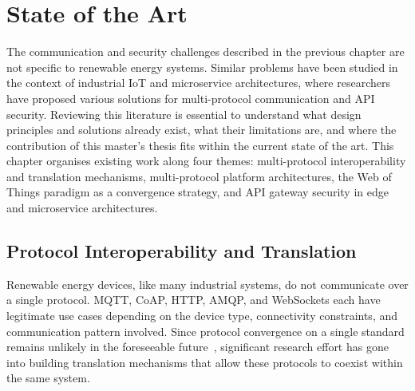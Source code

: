 \chapter{State of the Art}
\label{chap:state_of_the_art}

The communication and security challenges described in the previous chapter are not specific to renewable energy systems. Similar problems have been studied in the context of industrial IoT and microservice architectures, where researchers have proposed various solutions for multi-protocol communication and API security. Reviewing this literature is essential to understand what design principles and solutions already exist, what their limitations are, and where the contribution of this master's thesis fits within the current state of the art. This chapter organises existing work along four themes: multi-protocol interoperability and translation mechanisms, multi-protocol platform architectures, the Web of Things paradigm as a convergence strategy, and API gateway security in edge and microservice architectures.

\section{Protocol Interoperability and Translation}
\label{sec:soa_protocol_translation}

Renewable energy devices, like many industrial systems, do not communicate over a single protocol. MQTT, CoAP, HTTP, AMQP, and WebSockets each have legitimate use cases depending on the device type, connectivity constraints, and communication pattern involved. Since protocol convergence on a single standard remains unlikely in the foreseeable future~\cite{derhamy2017}, significant research effort has gone into building translation mechanisms that allow these protocols to coexist within the same system.

